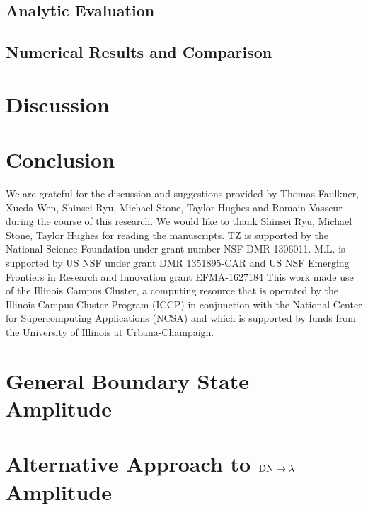 \documentclass[reprint, prb]{revtex4-1}
\begin{document}
\subsection{Analytic Evaluation}
\label{sec_sub:analy_eval}


\subsection{Numerical Results and Comparison}


\section{Discussion}
\label{sec:disc}


\section{Conclusion}
\label{sec:conclusion}



\begin{acknowledgments}
We are grateful for the discussion and suggestions provided by Thomas Faulkner, Xueda Wen, Shinsei Ryu, Michael Stone, Taylor Hughes and Romain Vasseur during the course of this research. We would like to thank Shinsei Ryu, Michael Stone, Taylor Hughes for reading the manuscripts. 
TZ is supported by the National Science Foundation under grant number NSF-DMR-1306011.
M.L. is supported by US NSF under grant DMR 1351895-CAR and US NSF Emerging Frontiers in Research and Innovation grant EFMA-1627184
This work made use of the Illinois Campus Cluster, a computing resource that is operated by the Illinois Campus Cluster Program (ICCP) in conjunction with the National Center for Supercomputing Applications (NCSA) and which is supported by funds from the University of Illinois at Urbana-Champaign.
\end{acknowledgments}

\appendix

\section{General Boundary State Amplitude}
\label{app:lambda_12}


\section{Alternative Approach to ${\rm DN} \rightarrow \lambda$ Amplitude}
\label{app:gnd_dn_lambda}

\end{document}
